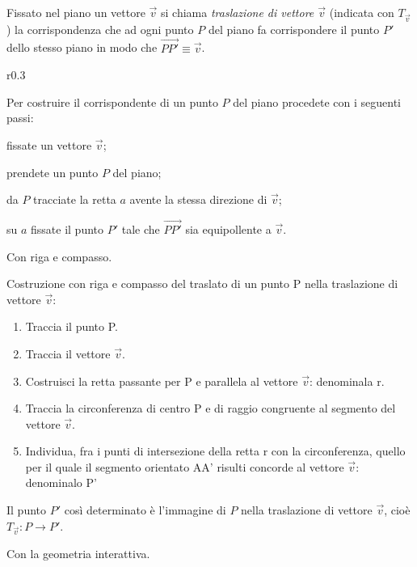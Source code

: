 \begin{definizione}
Fissato nel piano un vettore $\vec{v}$ si chiama \emph{traslazione di 
vettore $\vec{v}$} (indicata con $T_{\vec{v}}$) la corrispondenza che 
ad ogni punto $P$ del piano fa corrispondere il punto $P'$ dello 
stesso piano in modo che 
$\overset{\longrightarrow}{PP'}\equiv\vec{v}$.
\end{definizione}

\setlength{\intextsep}{3pt plus 2.0pt minus 2.0pt}
\begin{wrapfigure}{r}{0.3\textwidth}
  \centering
\end{wrapfigure}
Per costruire il corrispondente di un punto $P$ del piano procedete 
con i seguenti passi:
\begin{enumerate*}
\item fissate un vettore $\vec{v}$;
\item prendete un punto $P$ del piano;
\item da $P$ tracciate la retta $a$ avente la stessa direzione di 
$\vec{v}$;
\item su $a$ fissate il punto $P'$ tale che $\overrightarrow{PP'}$ 
sia equipollente a $\vec{v}$.
\end{enumerate*}

Con riga e compasso.

\begin{procedura}
  Costruzione con riga e compasso del traslato di un punto P nella traslazione 
di vettore $\vec{v}$:
  \begin{enumerate} [nosep]
    \item 
    Traccia il punto P.
    \item 
    Traccia il vettore $\vec{v}$.
    \item 
    Costruisci la retta passante per P e parallela al vettore $\vec{v}$: 
denominala r.
    \item 
    Traccia la circonferenza di centro P e di raggio congruente al segmento del 
vettore $\vec{v}$.
    \item 
    Individua, fra i punti di intersezione della retta r con la circonferenza, 
quello per il quale il segmento orientato AA' risulti concorde al vettore 
$\vec{v}$: denominalo P' 
  \end{enumerate}
  Il punto $P'$ così determinato è l'immagine di $P$ nella traslazione di 
vettore $\vec{v}$, 
  cioè $T_{\vec{v}}:P\rightarrow P'$.
\end{procedura}

Con la geometria interattiva.

